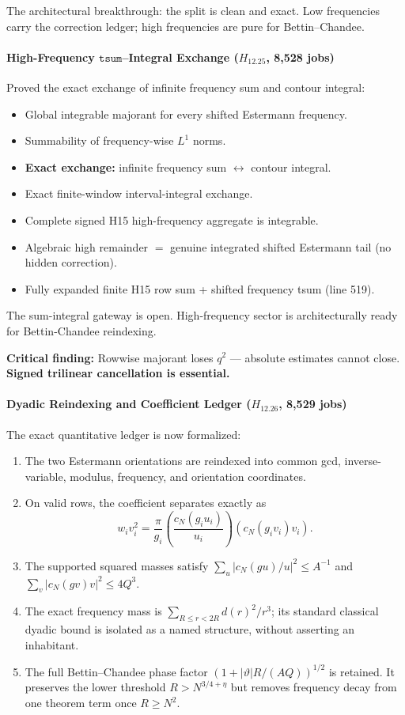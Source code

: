 \documentclass[11pt,a4paper]{article}
\theoremstyle{plain}
\theoremstyle{definition}
\theoremstyle{remark}
\begin{document}
The architectural breakthrough: the split is clean and exact. Low frequencies carry the correction ledger; high frequencies are pure for Bettin--Chandee.

\paragraph{High-Frequency $\mathtt{tsum}$--Integral Exchange ($H_{12.25}$, 8,528 jobs)}

Proved the exact exchange of infinite frequency sum and contour integral:
\begin{itemize}[leftmargin=2em]
  \item Global integrable majorant for every shifted Estermann frequency.
  \item Summability of frequency-wise $L^1$ norms.
  \item \textbf{Exact exchange:} infinite frequency sum $\leftrightarrow$ contour integral.
  \item Exact finite-window interval-integral exchange.
  \item Complete signed H15 high-frequency aggregate is integrable.
  \item Algebraic high remainder $=$ genuine integrated shifted Estermann tail (no hidden correction).
  \item Fully expanded finite H15 row sum + shifted frequency tsum (line 519).
\end{itemize}

The sum-integral gateway is open. High-frequency sector is architecturally ready for Bettin-Chandee reindexing.

\textbf{Critical finding:} Rowwise majorant loses $q^2$ — absolute estimates cannot close. \textbf{Signed trilinear cancellation is essential.}

\paragraph{Dyadic Reindexing and Coefficient Ledger ($H_{12.26}$, 8,529 jobs)}

The exact quantitative ledger is now formalized:
\begin{enumerate}[label=(\roman*)]
  \item The two Estermann orientations are reindexed into common gcd, inverse-variable, modulus, frequency, and orientation coordinates.
  \item On valid rows, the coefficient separates exactly as
  \[
    w_i v_i^2=\frac{\pi}{g_i}
      \left(\frac{c_N(g_i u_i)}{u_i}\right)
      \left(c_N(g_i v_i)v_i\right).
  \]
  \item The supported squared masses satisfy
  $\sum_u|c_N(gu)/u|^2\le A^{-1}$ and
  $\sum_v|c_N(gv)v|^2\le4Q^3$.
  \item The exact frequency mass is
  $\sum_{R\le r<2R}d(r)^2/r^3$; its standard classical dyadic bound is isolated as a named structure, without asserting an inhabitant.
  \item The full Bettin--Chandee phase factor
  $(1+|\vartheta|R/(AQ))^{1/2}$ is retained. It preserves the lower threshold $R>N^{3/4+\eta}$ but removes frequency decay from one theorem term once $R\ge N^2$.
\end{enumerate}
\end{document}
